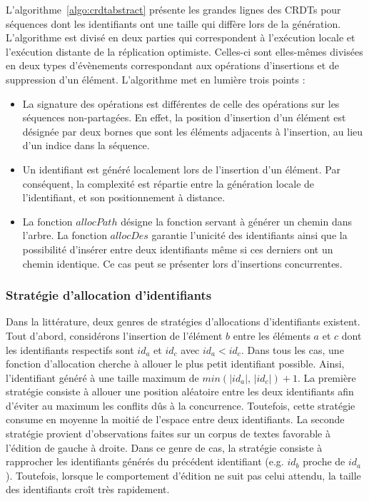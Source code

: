 L'algorithme~\ref{algo:crdtabstract} présente les grandes lignes des CRDTs pour
séquences dont les identifiants ont une taille qui diffère lors de la
génération. L'algorithme est divisé en deux parties qui correspondent à
l'exécution locale et l'exécution distante de la réplication
optimiste. Celles-ci sont elles-mêmes divisées en deux types d'évènements
correspondant aux opérations d'insertions et de suppression d'un
élément. L'algorithme met en lumière trois points :
\begin{itemize}
\item La signature des opérations est différentes de celle des opérations sur
  les séquences non-partagées. En effet, la position d'insertion d'un élément est
  désignée par deux bornes que sont les éléments adjacents à l'insertion, au lieu
  d'un indice dans la séquence.
\item Un identifiant est généré localement lors de l'insertion d'un élément. Par
  conséquent, la complexité est répartie entre la génération locale de
  l'identifiant, et son positionnement à distance.
\item La fonction $allocPath$ désigne la fonction servant à générer un chemin
  dans l'arbre. La fonction $allocDes$ garantie l'unicité des identifiants ainsi
  que la possibilité d'insérer entre deux identifiants même si ces derniers ont
  un chemin identique.  Ce cas peut se présenter lors d'insertions concurrentes.
\end{itemize}


\subsubsection{Stratégie d'allocation d'identifiants}

Dans la littérature, deux genres de stratégies d'allocations d'identifiants
existent. Tout d'abord, considérons l'insertion de l'élément $b$ entre les
éléments $a$ et $c$ dont les identifiants respectifs sont $id_a$ et $id_c$ avec
$id_a<id_c$. Dans tous les cas, une fonction d'allocation cherche à allouer le
plus petit identifiant possible. Ainsi, l'identifiant généré à une taille
maximum de $min(|id_a|,\, |id_c|)+1$. La première stratégie consiste à allouer
une position aléatoire entre les deux identifiants afin d'éviter au maximum les
conflits dûs à la concurrence. Toutefois, cette stratégie consume en moyenne la
moitié de l'espace entre deux identifiants. La seconde stratégie provient
d'observations faites sur un corpus de textes favorable à l'édition de gauche à
droite. Dans ce genre de cas, la stratégie consiste à rapprocher les
identifiants générés du précédent identifiant (e.g. $id_b$ proche de
$id_a$). Toutefois, lorsque le comportement d'édition ne suit pas celui attendu,
la taille des identifiants croît très rapidement.

